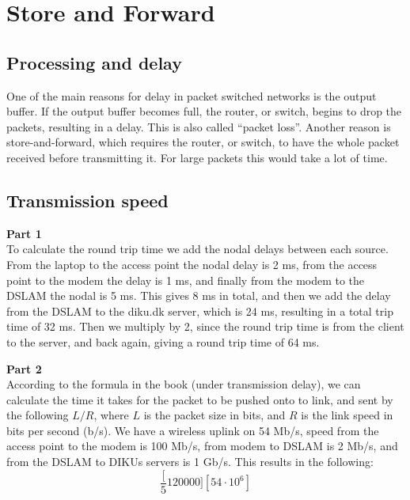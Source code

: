 \section{Store and Forward}
\subsection{Processing and delay}
One of the main reasons for delay in packet switched networks is the output
buffer. If the output buffer becomes full, the router, or switch, begins to drop
the packets, resulting in a delay. This is also called ``packet loss''. Another
reason is store-and-forward, which requires the router, or switch, to have the
whole packet received before transmitting it. For large packets this would take
a lot of time.

\subsection{Transmission speed}
\textbf{Part 1}\\
To calculate the round trip time we add the nodal delays between each source.
From the laptop to the access point the nodal delay is 2 ms, from the access
point to the modem the delay is 1 ms, and finally from the modem to the DSLAM
the nodal is 5 ms. This gives 8 ms in total, and then we add the delay from the
DSLAM to the diku.dk server, which is 24 ms, resulting in a total trip time of
32 ms. Then we multiply by 2, since the round trip time is from the client to
the server, and back again, giving a round trip time of 64 ms.

\noindent \textbf{Part 2}\\
According to the formula in the book (under transmission delay), we can
calculate the time it takes for the packet to be pushed onto to link, and sent
by the following $L/R$, where $L$ is the packet size in bits, and $R$ is the
link speed in bits per second (b/s). We have a wireless uplink on 54 Mb/s, speed
from the access point to the modem is 100 Mb/s, from modem to DSLAM is 2 Mb/s,
and from the DSLAM to DIKUs servers is 1 Gb/s.
This results in the following:
\[
\frac[5120000][54 \cdot 10^6]
\]